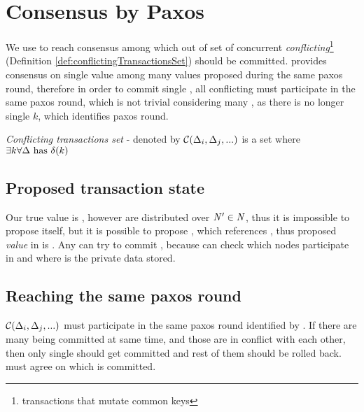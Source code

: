 
\section{Consensus by Paxos}
We use \paxos to reach consensus among \nodesTx which \transaction out of set of concurrent \emph{conflicting}\footnote{transactions that mutate common keys} \transactions (Definition \ref{def:conflictingTransactionsSet}) should be committed. \paxos provides consensus on single value among many values proposed during the same paxos round, therefore in order to commit single \transaction, all conflicting \transactions must participate in the same paxos round, which is not trivial considering many \mutationsFull, as there is no longer single $k$, which identifies paxos round.

\begin{definition}
\label{def:conflictingTransactionsSet}
\emph{Conflicting transactions set} - denoted by $\mathcal{C}\text{$(\Delta_{i}, \Delta_{j}, ...)$}$ is a set where $\exists k \forall \text{$\Delta$} \text{ has } \delta(k) $ 
\end{definition}

\subsection{Proposed transaction state}
Our true value is \transactionFull, however \mutations are distributed over $\text{$\mathit{N'}$}\in\mathit{N}$, thus it is impossible to propose \transaction itself, but it is possible to propose \txState, which references \mutations, thus proposed \paxos \emph{value} in \mpt is \txState. Any  can try to commit \transaction, because  can check which nodes participate in \transaction and where is the private data stored. 



\subsection{Reaching the same paxos round}
$\mathcal{C}\text{$(\Delta_{i}, \Delta_{j}, ...)$}$ must participate in the same paxos round identified by \paxosRoundId.
If there are many \transactions being committed at same time, and those \transactions are in conflict with each other, then only single \transaction should get committed and rest of them should be rolled back. \nodesTx must agree on which \transaction is committed.

